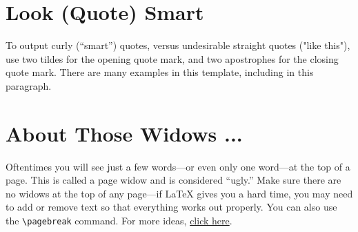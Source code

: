 \section{Look (Quote) Smart} \label{sec:smart}
To output curly (``smart'') quotes, versus undesirable straight quotes ("like this"), use two tildes for the opening quote mark, and two apostrophes for the closing quote mark. There are many examples in this template, including in this paragraph.


\section{About Those Widows ... }\label{sec:widows}
Oftentimes you will see just a few words---or even only one word---at the top of a page. This is called a page widow and is considered ``ugly.'' 
Make sure there are no widows at the top of any page---if \LaTeX{} gives you a hard time, you may need to add or remove text so that everything works out properly. You can also use the \verb+\pagebreak+ command. For more ideas, \href{https://wiki.nps.edu/pages/viewpage.action?pageId=720175227}{click here}.
